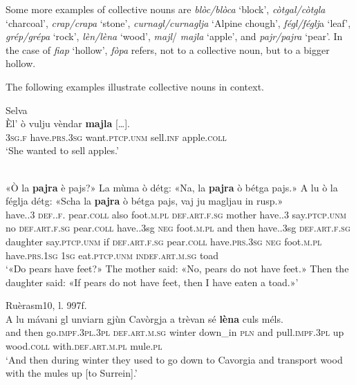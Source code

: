 Some more examples of collective nouns are \textit{blòc/blòca} `block', \textit{còtgal/còtgla} `charcoal',\textit{} \textit{crap/crapa} `stone', \textit{curnagl/curnaglja} `Alpine chough', \textit{fégl/féglj}a `leaf', \textit{grép/grépa} `rock', \textit{lèn/lèna} `wood', \textit{majl}/ \textit{majla} `apple', and \textit{pajr/pajra} `pear'. In the case of \textit{fiap} `hollow', \textit{fòpa} refers, not to a collective noun, but to a bigger hollow.

The following examples illustrate collective nouns in context.

\ea\label{}
 {Selva} {\citealt[26]{Büchli1966}}\\
\gll    Èl’ ò vulju vèndar \textbf{majla} […].\\ 
\textsc{3sg.f} have.\textsc{prs.3sg} want.\textsc{ptcp.unm} sell.\textsc{inf} apple.\textsc{coll}\\
\glt `She wanted to sell apples.'
\z

\ea\label{ex:1:adj}
 {\citealt[53]{Büchli1966}}\\
\gll «Ò la \textbf{pajra} è pajs?» La mùma ò détg: «Na, la \textbf{pajra} ò bétga pajs.» A lu ò la féglja détg: «Scha la \textbf{pajra} ò bétga pajs, vaj ju magljau in rusp.»\\
have.{\prs}.3{\sg} \textsc{def}.{\art}.\textsc{f}.{\sg} pear.\textsc{coll} also foot.\textsc{m.pl} \textsc{def.art.f.sg} mother have.{\prs}.3{\sg} say.\textsc{ptcp.unm} no \textsc{def.art.f.sg}  pear.\textsc{coll} have.{\prs.3sg} \textsc{neg} foot.\textsc{m.pl} and then have.{\prs.3sg} \textsc{def.art.f.sg} daughter say.\textsc{ptcp.unm} if \textsc{def.art.f.sg} pear.\textsc{coll} have.\textsc{prs.3sg} \textsc{neg} foot.\textsc{m.pl} have.\textsc{prs.1sg} \textsc{1sg} eat.\textsc{ptcp.unm} \textsc{indef.art.m.sg} toad\\
\glt `«Do pears have feet?» The mother said: «No, pears do not have feet.» Then the daughter said: «If pears do not have feet, then I have eaten a toad.»'
\z

\ea
\label{}
 {Ruèras}{m10, l. 997f.}\\
\gll  A lu mávani gl unviarn gjùn Cavòrgja a trèvan sé \textbf{lèna} culs méls.\\
and then go.\textsc{impf.3pl.3pl} \textsc{def.art.m.sg} winter down\_in \textsc{pln} and pull.\textsc{impf.3pl} up wood.\textsc{coll} with.\textsc{def.art.m.pl} mule.\textsc{pl} \\
\glt `And then during winter they used to go down to Cavorgia and transport wood with the mules up [to Surrein].'
\z

